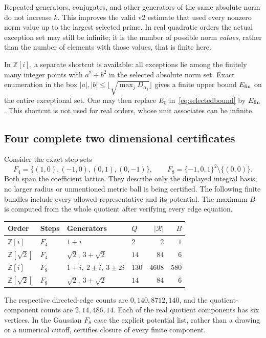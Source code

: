 \documentclass[11pt]{article}
\numberwithin{equation}{section}
\theoremstyle{definition}\newtheorem{definition}[theorem]{Definition}
\theoremstyle{remark}\newtheorem{remark}[theorem]{Remark}
\newcommand{\Z}{\mathbb Z}\newcommand{\Q}{\mathbb Q}\newcommand{\R}{\mathbb R}
\newcommand{\abs}[1]{\lvert #1\rvert}
\begin{document}
Repeated generators, conjugates, and other generators of the same absolute norm do not increase $k$. This improves the valid v2 estimate that used every nonzero norm value up to the largest selected prime. In real quadratic orders the actual exception set may still be infinite; it is the number of possible norm \emph{values}, rather than the number of elements with those values, that is finite here.

In $\Z[i]$, a separate shortcut is available: all exceptions lie among the finitely many integer points with $a^2+b^2$ in the selected absolute norm set. Exact enumeration in the box $\abs a,\abs b\le\lfloor\sqrt{\max_j D_{\alpha_j}}\rfloor$ gives a finite upper bound $E_{\rm fin}$ on the entire exceptional set. One may then replace $E_0$ in~\eqref{eq:selectedbound} by $E_{\rm fin}$. This shortcut is not used for real orders, whose unit associates can be infinite.

\subsection{Four complete two dimensional certificates}

Consider the exact step sets
\[
 F_4=\{(1,0),(-1,0),(0,1),(0,-1)\},\qquad
 F_8=\{-1,0,1\}^2\setminus\{(0,0)\}.
\]
Both span the coefficient lattice. They describe only the displayed integral basis; no larger radius or unmentioned metric ball is being certified. The following finite bundles include every allowed representative and its potential. The maximum $B$ is computed from the whole quotient after verifying every edge equation.

\begin{center}
\small
\begin{tabular}{@{}llllrr@{}}
Order & Steps & Generators & $Q$ & $\abs{\mathcal R}$ & $B$\\
\hline
$\Z[i]$ & $F_4$ & $1+i$ & $2$ & $2$ & $1$\\
$\Z[\sqrt2]$ & $F_4$ & $\sqrt2,\ 3+\sqrt2$ & $14$ & $84$ & $6$\\
$\Z[i]$ & $F_8$ & $1+i,\ 2\pm i,\ 3\pm2i$ & $130$ & $4608$ & $580$\\
$\Z[\sqrt2]$ & $F_8$ & $\sqrt2,\ 3+\sqrt2$ & $14$ & $84$ & $6$\\
\end{tabular}
\end{center}

The respective directed-edge counts are $0,140,8712,140$, and the quotient-component counts are $2,14,486,14$. Each of the real quotient components has six vertices. In the Gaussian $F_8$ case the explicit potential list, rather than a drawing or a numerical cutoff, certifies closure of every finite component.
\end{document}
